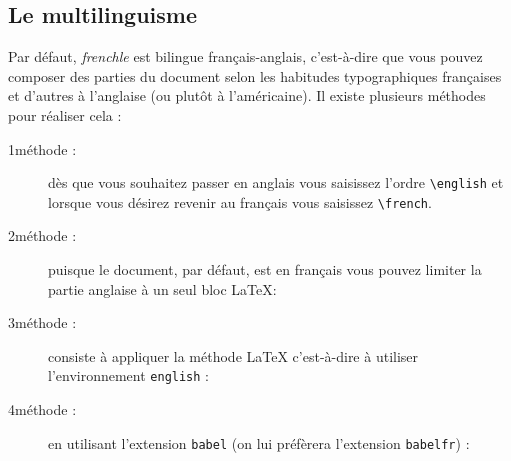 \documentclass[a4paper,12pt,openright]{article}
\begin{document}
\subsection{Le multilinguisme}\label{multilin}
Par défaut, \textit{frenchle} est bilingue français-anglais, c’est-à-dire que vous pouvez
composer des parties du document selon les habitudes typographiques
françaises et d’autres à l’anglaise (ou plutôt à l’américaine). Il existe plusieurs
méthodes pour réaliser cela :
\begin{description}
\item[1\iere méthode :] dès que vous souhaitez passer en anglais vous saisissez l’ordre
\verb|\english| et lorsque vous désirez revenir au français vous 
saisissez \verb|\french|.
\begin{center}
\end{center}
\item[2\ieme méthode :] puisque le document, par défaut, est en français vous pouvez
limiter la partie anglaise à un seul bloc \LaTeX{}:
\begin{center}
\end{center}
\item[3\ieme méthode :] consiste à appliquer la méthode \LaTeX{} c’est-à-dire à utiliser
l’environnement \texttt{english} :
\begin{center}
\end{center}
\item[4\ieme méthode :] en utilisant l’extension \texttt{babel}
(on lui préfèrera l’extension \texttt{babelfr}) :
\begin{center}
\\[1ex]
\end{center}
\end{description}
\end{document}

